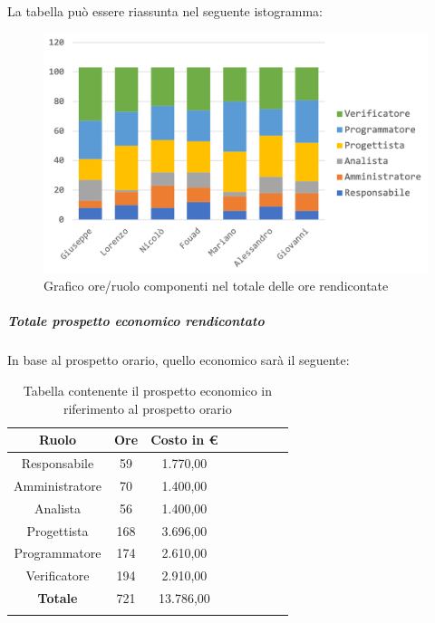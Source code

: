 				La tabella può essere riassunta nel seguente istogramma:
				\begin{figure}[H]
					\centering
					\includegraphics[width=0.8\linewidth]{./images/preventivo/totOreRed1.png}
					\caption{Grafico ore/ruolo componenti nel totale delle ore rendicontate}
					\label{fig:grafico suddivione ruoli totale ore rendicontete}
				\end{figure}
			
				\subparagraph{Totale prospetto economico rendicontato}
				In base al prospetto orario, quello economico sarà il seguente: 
				
				\begin{longtable}{|c|c|c|c|c|c|c|c|}
					\hline
					\rowcolor{lighter-grayer}
					\textbf{Ruolo} & \textbf{Ore} & \textbf{Costo in €} \\
					\hline
					\endfirsthead
					
					\hline
					Responsabile 	    & 59 & 1.770,00\\
					\hline 
					\hline
					Amministratore	  & 70 & 1.400,00\\
					\hline
					\hline
					Analista 				& 56 & 1.400,00\\
					\hline
					\hline
					Progettista 		  & 168 & 3.696,00\\
					\hline
					\hline
					Programmatore 	 & 174 & 2.610,00\\
					\hline
					\hline
					Verificatore 		  & 194 & 2.910,00\\
					\hline
					\textbf{Totale} 	& 721 & 13.786,00\\
					\hline
					\caption{Tabella contenente il prospetto economico in riferimento al prospetto orario}
				\end{longtable}
				\pagebreak
				
